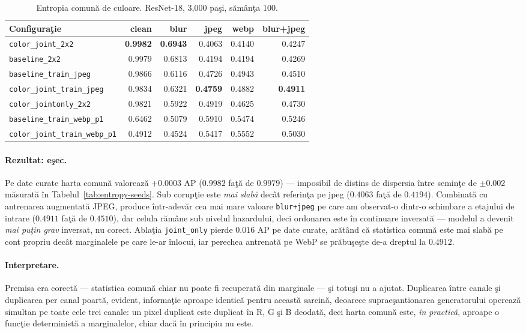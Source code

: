 \begin{table}[t]
  \centering
  \caption{Entropia comună de culoare. ResNet-18, 3{,}000 paşi, sămânţa 100.}
  \label{tab:color}
  \begin{tabular}{lrrrrr}
    \toprule
    Configuraţie & clean & blur & jpeg & webp & blur+jpeg \\
    \midrule
    \texttt{color\_joint\_2x2}          & \textbf{0.9982} & \textbf{0.6943} & 0.4063 & 0.4140 & 0.4247 \\
    \texttt{baseline\_2x2}              & 0.9979 & 0.6813 & 0.4194 & 0.4194 & 0.4269 \\
    \texttt{baseline\_train\_jpeg}      & 0.9866 & 0.6116 & 0.4726 & 0.4943 & 0.4510 \\
    \texttt{color\_joint\_train\_jpeg}  & 0.9834 & 0.6321 & \textbf{0.4759} & 0.4882 & \textbf{0.4911} \\
    \texttt{color\_jointonly\_2x2}      & 0.9821 & 0.5922 & 0.4919 & 0.4625 & 0.4730 \\
    \texttt{baseline\_train\_webp\_p1}  & 0.6462 & 0.5079 & 0.5910 & 0.5474 & 0.5246 \\
    \texttt{color\_joint\_train\_webp\_p1} & 0.4912 & 0.4524 & 0.5417 & 0.5552 & 0.5030 \\
    \bottomrule
  \end{tabular}
\end{table}

\paragraph{Rezultat: eşec.} Pe date curate harta comună valorează $+0.0003$ AP
($0.9982$ faţă de $0.9979$) --- imposibil de distins de dispersia între seminţe
de $\pm0.002$ măsurată în Tabelul~\ref{tab:entropy-seeds}. Sub corupţie este
\emph{mai slabă} decât referinţa pe jpeg ($0.4063$ faţă de $0.4194$). Combinată
cu antrenarea augmentată JPEG, produce într-adevăr cea mai mare valoare
\texttt{blur+jpeg} pe care am observat-o dintr-o schimbare a etajului de intrare
($0.4911$ faţă de $0.4510$), dar celula rămâne sub nivelul hazardului, deci
ordonarea este în continuare inversată --- modelul a devenit \emph{mai puţin
grav} inversat, nu corect. Ablaţia \texttt{joint\_only} pierde $0.016$ AP pe
date curate, arătând că statistica comună este mai slabă pe cont propriu decât
marginalele pe care le-ar înlocui, iar perechea antrenată pe WebP se prăbuşeşte
de-a dreptul la $0.4912$.

\paragraph{Interpretare.} Premisa era corectă --- statistica comună chiar nu
poate fi recuperată din marginale --- şi totuşi nu a ajutat. Duplicarea între
canale şi duplicarea per canal poartă, evident, informaţie aproape identică
pentru această sarcină, deoarece supraeşantionarea generatorului operează
simultan pe toate cele trei canale: un pixel duplicat este duplicat în R, G şi B
deodată, deci harta comună este, \emph{în practică}, aproape o funcţie
deterministă a marginalelor, chiar dacă în principiu nu este.

